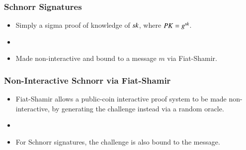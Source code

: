 \documentclass[hyperref={pdfpagelabels=true},table,dvipsnames,14pt,aspectratio=169]{beamer}
\begin{document}
\begin{frame}
  \frametitle{Schnorr Signatures}

  \begin{itemize}
    \item<1-> Simply a sigma proof of knowledge of $\mathit{sk}$, where $\mathit{PK} = g^{\mathit{sk}}$. 
    \item[]
    \item<2-> Made non-interactive and bound to a message $m$ via Fiat-Shamir. 
  \end{itemize}
\end{frame}

\begin{frame}
  \centering
\scalebox{0.9} {
}
\end{frame}

\begin{frame}
  \frametitle{Non-Interactive Schnorr via Fiat-Shamir}

  \begin{itemize}
	  \item<1-> Fiat-Shamir allows a public-coin interactive proof system to be made non-interactive, 
	    by generating the challenge instead via a random oracle.
    \item[]
    \item<2-> For Schnorr signatures, the challenge is also bound to the message. 
  \end{itemize}
\end{frame}
\end{document}
